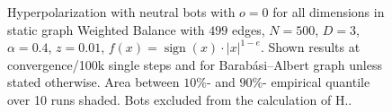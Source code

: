 \documentclass[11pt]{article}
\DeclareMathOperator{\sign}{sign}
\begin{document}
\begin{figure}[!htb]
\begin{center}

\end{center}
\caption{
Hyperpolarization with neutral bots with $o=0$ for all dimensions in static graph Weighted Balance with $499$ edges, $N=500$, $D=3$, $\alpha=0.4$, $z=0.01$, $f(x)=\sign(x)\cdot|x|^{1-e}$. Shown results at convergence/100k single steps and for Barabási–Albert graph unless stated otherwise. Area between $10\%$- and $90\%$- empirical quantile over 10 runs shaded. Bots excluded from the calculation of H..
}
\end{figure}
\end{document}
